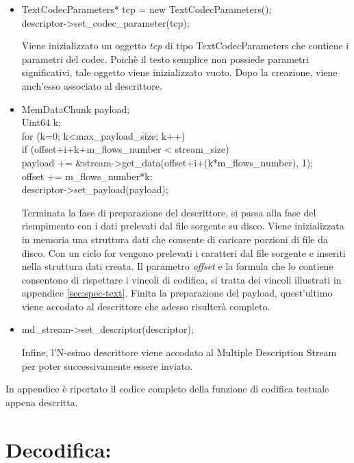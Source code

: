\begin{itemize}
 \item \begin{code}
TextCodecParameters* tcp = new TextCodecParameters();\\
descriptor->set\_codec\_parameter(tcp);\\
\end{code}
Viene inizializzato un oggetto \textit{tcp} di tipo TextCodecParameters che
contiene i parametri del codec. Poichè il testo semplice non possiede parametri significativi, tale oggetto viene inizializzato vuoto. Dopo la creazione, viene anch'esso associato al descrittore.

 \item \begin{code}
MemDataChunk payload;\\
Uint64 k;\\
for (k=0; k<max\_payload\_size; k++)\\
	if (offset+i+k+m\_flows\_number < stream\_size)\\
		payload += \&stream->get\_data(offset+i+(k*m\_flows\_number), 1);\\
offset += m\_flows\_number*k;\\
descriptor->set\_payload(payload);\\
\end{code}
Terminata la fase di preparazione del descrittore, si passa alla fase del
riempimento con i dati prelevati dal file sorgente su disco. Viene inizializzata
in memoria una struttura dati che consente di caricare porzioni di file da disco.
Con un ciclo for vengono prelevati i caratteri dal file sorgente e inseriti nella
struttura dati creata. Il parametro \textit{offset} e la formula che lo contiene
consentono di rispettare i vincoli di codifica, si tratta dei vincoli illustrati
in appendice \ref{sec:spec-text}. Finita la preparazione del payload,
quest'ultimo viene accodato al descrittore che adesso risulterà completo.

 \item \begin{code}
md\_stream->set\_descriptor(descriptor);\\
\end{code}
Infine, l'N-esimo descrittore viene accodato al Multiple Description Stream per poter successivamente essere inviato.
\end{itemize}
In appendice è riportato il codice completo della funzione di codifica testuale
appena descritta.

\section{Decodifica:}



